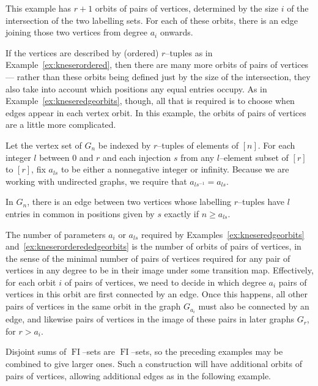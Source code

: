 \documentclass[ALCO,ThmDefs,Unicode,epreuves]{cedram}
\DeclareMathOperator{\FI}{FI}
\begin{document}
This example has $r+1$ orbits of pairs of vertices, determined by the size $i$ of the intersection of the two labelling sets. For each of these orbits, there is an edge joining those two vertices from degree $a_i$ onwards.

If the vertices are described by (ordered) $r$--tuples as in Example~\ref{ex:kneserordered}, then there are many more orbits of pairs of vertices --- rather than these orbits being defined just by the size of the intersection, they also take into account which positions any equal entries occupy. As in Example~\ref{ex:kneseredgeorbits}, though, all that is required is to choose when edges appear in each vertex orbit. In this example, the orbits of pairs of vertices are a little more complicated.

\begin{example}\label{ex:kneserorderededgeorbits}
Let the vertex set of $G_n$ be indexed by $r$--tuples of elements of $[n]$. For each integer $l$ between $0$ and $r$ and each injection $s$ from any $l$--element subset of $[r]$ to $[r]$, fix $a_{ls}$ to be either a nonnegative integer or infinity. Because we are working with undirected graphs, we require that $a_{ls^{-1}} = a_{ls}$.

In $G_n$, there is an edge between two vertices whose labelling $r$--tuples have $l$ entries in common in positions given by $s$ exactly if $n \geq a_{ls}$. 
\end{example}

The number of parameters $a_i$ or $a_{ls}$ required by Examples~\ref{ex:kneseredgeorbits} and~\ref{ex:kneserorderededgeorbits} is the number of orbits of pairs of vertices, in the sense of the minimal number of pairs of vertices required for any pair of vertices in any degree to be in their image under some transition map. Effectively, for each orbit $i$ of pairs of vertices, we need to decide in which degree $a_i$ pairs of vertices in this orbit are first connected by an edge. Once this happens, all other pairs of vertices in the same orbit in the graph $G_{a_i}$ must also be connected by an edge, and likewise pairs of vertices in the image of these pairs in later graphs $G_r$, for $r > a_i$.

Disjoint sums of $\FI$--sets are $\FI$--sets, so the preceding examples may be combined to give larger ones. Such a construction will have additional orbits of pairs of vertices, allowing additional edges as in the following example.
\end{document}
